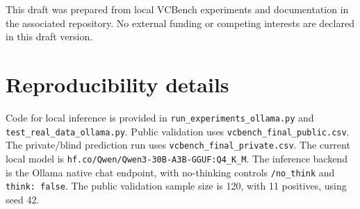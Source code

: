 \documentclass{article}
\begin{document}
\begin{ack}
This draft was prepared from local VCBench experiments and documentation in the
associated repository. No external funding or competing interests are declared
in this draft version.
\end{ack}




\appendix

\section{Reproducibility details}

Code for local inference is provided in \texttt{run\_experiments\_ollama.py} and
\texttt{test\_real\_data\_ollama.py}. Public validation uses
\texttt{vcbench\_final\_public.csv}. The private/blind prediction run uses
\texttt{vcbench\_final\_private.csv}. The current local model is
\texttt{hf.co/Qwen/Qwen3-30B-A3B-GGUF:Q4\_K\_M}. The inference backend is the
Ollama native chat endpoint, with no-thinking controls \texttt{/no\_think} and
\texttt{think: false}. The public validation sample size is 120, with 11
positives, using seed 42.

\newpage

\end{document}
